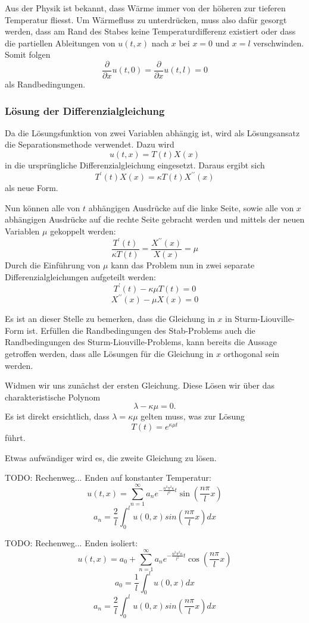 Aus der Physik ist bekannt, dass Wärme immer von der höheren zur tieferen
Temperatur fliesst. Um Wärmefluss zu unterdrücken, muss also dafür gesorgt
werden, dass am Rand des Stabes keine Temperaturdifferenz existiert oder 
dass die partiellen Ableitungen von $u(t,x)$ nach $x$ bei $x = 0$ und $x = l$
verschwinden. Somit folgen
\[
    \frac{\partial}{\partial x} u(t, 0)
    =
    \frac{\partial}{\partial x} u(t, l)
    =
    0
\]
als Randbedingungen.


\subsubsection{Lösung der Differenzialgleichung}


Da die Lösungsfunktion von zwei Variablen abhängig ist, wird als Lösungsansatz
die Separationsmethode verwendet. Dazu wird 
\[
    u(t,x)
    =
    T(t)X(x)
\]
in die ursprüngliche Differenzialgleichung eingesetzt. Daraus ergibt sich 
\[
    T^{\prime}(t)X(x)
    =
    \kappa T(t)X^{\prime \prime}(x)
\]
als neue Form.

Nun können alle von $t$ abhängigen Ausdrücke auf die linke Seite, sowie alle
von $x$ abhängigen Ausdrücke auf die rechte Seite gebracht werden und mittels
der neuen Variablen $\mu$ gekoppelt werden:
\[
    \frac{T^{\prime}(t)}{\kappa T(t)}
    =
    \frac{X^{\prime \prime}(x)}{X(x)}
    =
    \mu
\]
Durch die Einführung von $\mu$ kann das Problem nun in zwei separate
Differenzialgleichungen aufgeteilt werden:
\[
    T^{\prime}(t) - \kappa \mu T(t)
    =
    0
\]
\[
    X^{\prime \prime}(x) - \mu X(x)
    =
    0
\]

Es ist an dieser Stelle zu bemerken, dass die Gleichung in $x$ in 
Sturm-Liouville-Form ist. Erfüllen die Randbedingungen des Stab-Problems auch
die Randbedingungen des Sturm-Liouville-Problems, kann bereits die Aussage
getroffen werden, dass alle Lösungen für die Gleichung in $x$ orthogonal sein
werden.

Widmen wir uns zunächst der ersten Gleichung. Diese Lösen wir über das
charakteristische Polynom
\[
    \lambda - \kappa \mu
    =
    0.
\]
Es ist direkt ersichtlich, dass $\lambda = \kappa \mu$ gelten muss, was zur
Lösung
\[
    T(t)
    =
    e^{\kappa \mu t}
\]
führt.

Etwas aufwändiger wird es, die zweite Gleichung zu lösen.

TODO: Rechenweg... Enden auf konstanter Temperatur:
\[
    u(t,x)
    =
    \sum_{n=1}^{\infty}a_{n}e^{-\frac{n^{2}\pi^{2}\kappa}{l^{2}}t}
    \sin\left(\frac{n\pi}{l}x\right)
\]
\[
    a_{n}
    =
    \frac{2}{l}\int_{0}^{l}u(0,x)sin\left(\frac{n\pi}{l}x\right) dx
\]

TODO: Rechenweg... Enden isoliert:
\[
    u(t,x)
    =
    a_{0} + \sum_{n=1}^{\infty}a_{n}e^{-\frac{n^{2}\pi^{2}\kappa}{l^{2}}t}
    \cos\left(\frac{n\pi}{l}x\right)
\]
\[
    a_{0}
    =
    \frac{1}{l}\int_{0}^{l}u(0,x) dx
\]
\[
    a_{n}
    =
    \frac{2}{l}\int_{0}^{l}u(0,x)sin\left(\frac{n\pi}{l}x\right) dx
\]
